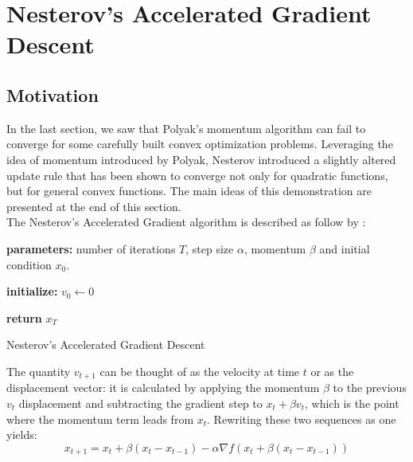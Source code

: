 \documentclass{article}
\begin{document}
%
%


\section{Nesterov's Accelerated Gradient Descent}

\subsection{Motivation}

In the last section, we saw that Polyak's momentum algorithm can fail to converge for some carefully built convex optimization problems. Leveraging the idea of momentum introduced by Polyak, Nesterov introduced a slightly altered update rule that has been shown to converge not only for quadratic functions, but for general convex functions. 
The main ideas of this demonstration are presented at the end of this section.\\

The Nesterov's Accelerated Gradient algorithm is described as follow by \citet{Sutskever2013}:
\begin{algorithm}[H]
\SetAlgoLined
\textbf{parameters:} number of iterations $T$, step size $\alpha$, momentum $\beta$ and initial condition $x_0$.

\textbf{initialize:} $v_0 \gets 0$

 
 \textbf{return } $x_{T}$
 \caption{Nesterov's Accelerated Gradient Descent \label{NAGD}}
\end{algorithm}


The quantity $v_{t+1}$ can be thought of as the velocity at time $t$ or as the displacement vector: it is calculated by applying the  momentum $\beta$ to the previous $v_t$ displacement and subtracting the gradient step to $x_t + \beta v_t$, which is the point where the momentum term leads from $x_t$. 
Rewriting these two sequences as one yields:
\begin{equation} \label{eq:2}
	x_{t+1} = x_t + \beta(x_t - x_{t-1}) - \alpha \nabla f(x_t + \beta (x_t - x_{t-1}))
\end{equation}
\end{document}
